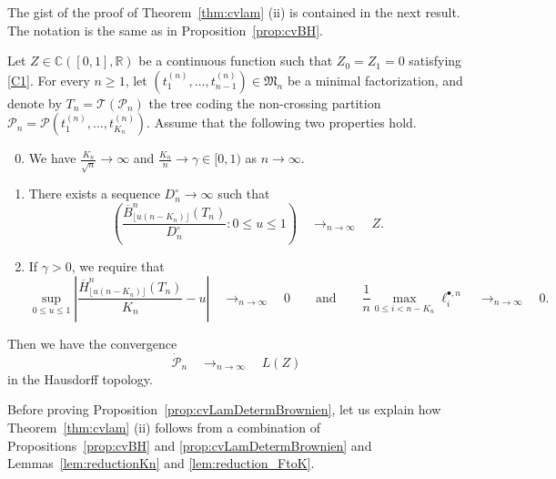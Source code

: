 \documentclass[10pt]{amsart}
\theoremstyle{definition}\newtheorem{defi}[theo]{Definition}\newtheorem{rema}[theo]{Remark}\newtheorem{exam}[theo]{Example}\newtheorem{exem}[theo]{Example}\newtheorem{nota}[theo]{Notation}
\newcommand{\R}{\mathbb{R}}
\def\PPP{\mathcal P}
\def\Dcn{D^{\circ}_{n}}
\def\oB{\overline{B}}
\def\oH{\overline{H}}
\begin{document}
 The gist of the proof of Theorem~\ref{thm:cvlam} (ii) is contained in the next result.
 The notation is the same as in Proposition~\ref{prop:cvBH}.

\begin{proposition}
  \label{prop:cvLamDetermBrownien} Let $Z \in {\mathbb{C}}([0, 1], \R)$ be a continuous function such that $Z_{0}=Z_{1}=0$ satisfying \ref{C1}. For every $n \geq 1$, let $(t_{1}^{(n)}, \ldots, t_{n-1}^{(n)}) \in \mathfrak{M}_{n}$  be a minimal factorization, and denote by $T_{n}= \mathcal{T}(  \PPP_{n})$ the tree coding the non-crossing partition $  \PPP_{n}=\PPP(  t_{1}^{(n)}, \ldots, t_{K_{n}}^{(n)})$. Assume that the following two properties hold.
  \begin{enumerate}[label=\color{blue}(D\arabic*)]
    \setcounter{enumi}{-1}
\item\label{D0} We have $\frac{K_{n}}{\sqrt{n}} \rightarrow \infty$ and $ \tfrac{K_{n}}{n} \rightarrow \gamma \in [0,1)$ as $n \rightarrow \infty$.
\item\label{D1} There exists a sequence $\Dcn \rightarrow \infty$ such that
\[  \left(  \frac{\oB^{n}_{\lfloor u (n-K_{n}) \rfloor} (T_{n})}{ \Dcn} : 0\leq u \leq 1\right)  \quad \mathop{\longrightarrow}_{n \rightarrow \infty} \quad Z.\]
\item\label{D2} If $\gamma>0$, we require that
\[ \sup_{0 \leq u \leq 1} \left|   \frac{\oH^{n}_{ \lfloor u (n-K_{n}) \rfloor  }(T_{n})}{K_{n}}-u\right|  \quad \mathop{\longrightarrow}_{n \rightarrow \infty} \quad 0 \qquad \textrm{and} \qquad \frac{1}{n} \max_{0 \leq i < n-K_{n}} \ell^{\bullet,n}_{i}    \quad \mathop{\longrightarrow}_{n \rightarrow \infty} \quad 0.\]
\end{enumerate}
Then we have the  convergence
\begin{equation}
   \dot{\PPP}_{n}    \quad \mathop{\longrightarrow}_{n \rightarrow \infty} \quad L(Z)
\label{eq:cv_FP_SkorokhodBrownien}
\end{equation}
in the Hausdorff topology.
\end{proposition}

Before proving Proposition~\ref{prop:cvLamDetermBrownien}, let us explain how Theorem~\ref{thm:cvlam} (ii)  follows from a combination of Propositions~\ref{prop:cvBH} and \ref{prop:cvLamDetermBrownien} and Lemmas~\ref{lem:reductionKn} and \ref{lem:reduction_FtoK}.
\end{document}
